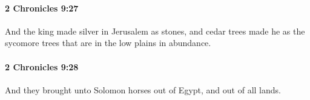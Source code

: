 		\paragraph{2 Chronicles 9:27} %
			\label{2CHRONICLES-9-27}

			And the king made silver in Jerusalem as stones, and cedar trees made he as the sycomore trees that are in the low plains in abundance.


		\paragraph{2 Chronicles 9:28} %
			\label{2CHRONICLES-9-28}

			And they brought unto Solomon horses out of Egypt, and out of all lands.


